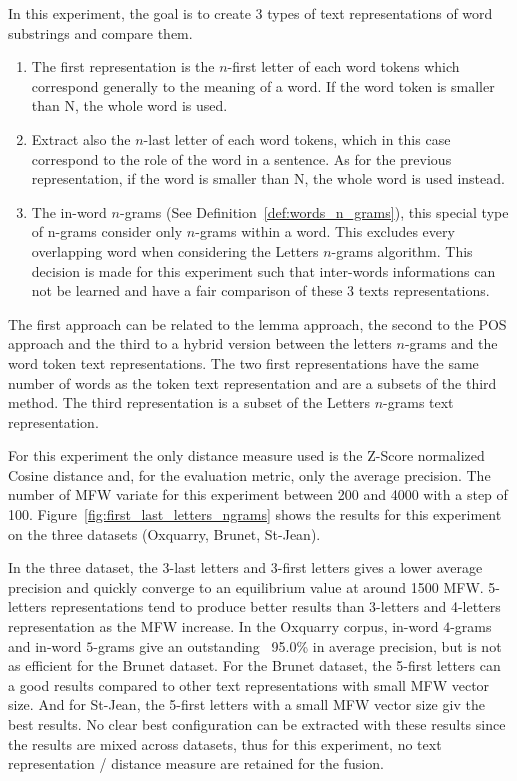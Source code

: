 In this experiment, the goal is to create 3 types of text representations of word substrings and compare them.

\begin{enumerate}
  \item
  The first representation is the $n$-first letter of each word tokens which correspond generally to the meaning of a word.
  If the word token is smaller than N, the whole word is used.
  \item
  Extract also the $n$-last letter of each word tokens, which in this case correspond to the role of the word in a sentence.
  As for the previous representation, if the word is smaller than N, the whole word is used instead.
  \item
  The in-word $n$-grams (See Definition~\ref{def:words_n_grams}), this special type of n-grams consider only $n$-grams within a word.
  This excludes every overlapping word when considering the Letters $n$-grams algorithm.
  This decision is made for this experiment such that inter-words informations can not be learned and have a fair comparison of these 3 texts representations.
\end{enumerate}

The first approach can be related to the lemma approach, the second to the POS approach and the third to a hybrid version between the letters $n$-grams and the word token text representations.
The two first representations have the same number of words as the token text representation and are a subsets of the third method.
The third representation is a subset of the Letters $n$-grams text representation.

For this experiment the only distance measure used is the Z-Score normalized Cosine distance and, for the evaluation metric, only the average precision.
The number of MFW variate for this experiment between 200 and 4000 with a step of 100.
Figure~\ref{fig:first_last_letters_ngrams} shows the results for this experiment on the three datasets (Oxquarry, Brunet, St-Jean).

In the three dataset, the 3-last letters and 3-first letters gives a lower average precision and quickly converge to an equilibrium value at around 1500 MFW.
5-letters representations tend to produce better results than 3-letters and 4-letters representation as the MFW increase.
In the Oxquarry corpus, in-word $4$-grams and in-word $5$-grams give an outstanding ~95.0\% in average precision, but is not as efficient for the Brunet dataset.
For the Brunet dataset, the 5-first letters can a good results compared to other text representations with small MFW vector size.
And for St-Jean, the 5-first letters with a small MFW vector size giv the best results.
No clear best configuration can be extracted with these results since the results are mixed across datasets, thus for this experiment, no text representation / distance measure are retained for the fusion.

